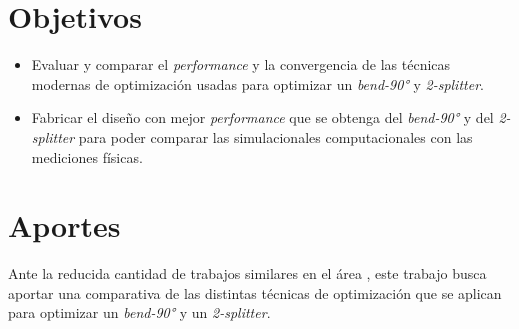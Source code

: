 \section{Objetivos}

\begin{itemize}

  \item Evaluar y comparar el \emph{performance} y la convergencia de las técnicas modernas de optimización usadas para optimizar un \emph{bend-90°} y \emph{2-splitter}.

  \item Fabricar el diseño con mejor \emph{performance} que se obtenga del \emph{bend-90°} y del \emph{2-splitter} para poder comparar las simulacionales computacionales con las mediciones físicas.


\end{itemize}



\section{Aportes}

Ante la reducida cantidad de trabajos similares en el área \citep{Schneider2019, Elsawy2020}, este trabajo busca aportar una comparativa de las distintas técnicas de optimización que se aplican para optimizar un \emph{bend-90°} y un \emph{2-splitter}. 
